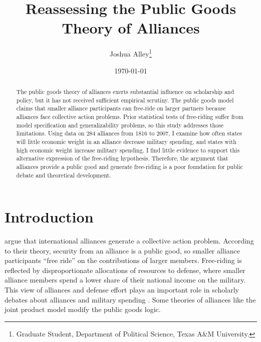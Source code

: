 \documentclass[12pt]{article}
\title{
\textbf{Reassessing the Public Goods Theory of Alliances}
	}
\author{Joshua Alley\footnote{Graduate Student,
Department of Political Science, Texas A\&M University.}}
\date{{\normalsize \today}}
\begin{document}
\maketitle 

\doublespace

\begin{abstract}
The public goods theory of alliances exerts substantial influence on scholarship and policy, but it has not received sufficient empirical scrutiny. 
The public goods model claims that smaller alliance participants can free-ride on larger partners because alliances face collective action problems. 
Prior statistical tests of free-riding suffer from model specification and generalizability problems, so this study addresses those limitations. 
Using data on 284 alliances from 1816 to 2007, I examine how often states will little economic weight in an alliance decrease military spending, and states with high economic weight increase military spending. 
I find little evidence to support this alternative expression of the free-riding hypothesis. 
Therefore, the argument that alliances provide a public good and generate free-riding is a poor foundation for public debate and theoretical development. 
\end{abstract} 

\newpage


\section{Introduction}



\citet{OlsonZeckhauser1966} argue that international alliances generate a collective action problem. 
According to their theory, security from an alliance is a public good, so smaller alliance participants ``free ride'' on the contributions of larger members. 
Free-riding is reflected by disproportionate allocations of resources to defense, where smaller alliance members spend a lower share of their national income on the military.
This view of alliances and defense effort plays an important role in scholarly debates about alliances and military spending \citep{Walt1990, Mearsheimer1994, Goldstein1995, SandlerHartley2001, Garfinkel2004, Walt2009, Norrlof2010, Barrett2010, PluemperNeumayer2015}. 
Some theories of alliances like the joint product model \citep{Sandler1993} modify the public goods logic. 
\end{document}
